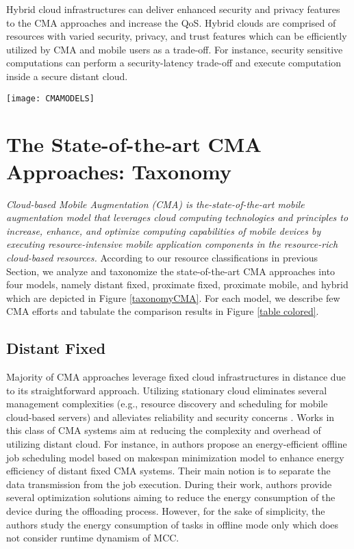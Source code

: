 \documentclass[publish]{IEEEtran}
\begin{document}
Hybrid cloud infrastructures can deliver enhanced security and privacy features to the CMA approaches and increase the QoS. Hybrid clouds are comprised of resources with varied security, privacy, and trust features which can be efficiently utilized by CMA and mobile users as a trade-off. For instance, security sensitive computations can perform a security-latency trade-off and execute computation inside a secure distant cloud.

\begin{figure*}[t]
\centering
\texttt{[image: CMAMODELS]} 
\caption{Taxonomy of State-of-the-art CMA Models.} \label{taxonomyCMA}
\end{figure*}

\section{The State-of-the-art CMA Approaches: Taxonomy}\label{state-of-the-art}
\textit{Cloud-based Mobile Augmentation (CMA) is the-state-of-the-art mobile augmentation model that leverages cloud computing technologies and principles to increase, enhance, and optimize computing capabilities of mobile devices by executing resource-intensive mobile application components in the resource-rich cloud-based resources.} According to our resource classifications in previous Section, we analyze and taxonomize the state-of-the-art CMA approaches into four models, namely distant fixed, proximate fixed, proximate mobile, and hybrid which are depicted in Figure \ref{taxonomyCMA}. For each model, we describe few CMA efforts and tabulate the comparison results in Figure \ref{table colored}. 

\subsection{Distant Fixed}
Majority of CMA approaches \cite{Chuna, Chun2009, Kemp2010, Kemp2010a, Kempa,Guo2011, Zhang2011, cuervo2010maui,Chun2011,Verbelen2012, Broberg2009, DiFrancesco2012} leverage fixed cloud infrastructures in distance due to its straightforward approach. Utilizing stationary cloud eliminates several management complexities (e.g., resource discovery and scheduling for mobile cloud-based servers) and alleviates reliability and security concerns \cite{Kristensen2010}. Works in this class of CMA systems aim at reducing the complexity and overhead of utilizing distant cloud. For instance, in \cite{DiFrancesco2012} authors propose an energy-efficient offline job scheduling  model based on makespan minimization model to enhance energy efficiency of distant fixed CMA systems. Their main notion is to separate the data transmission from the job execution. During their work, authors provide several optimization solutions aiming to reduce the energy consumption of the device during the offloading process. However, for the sake of simplicity, the authors study the energy consumption of tasks in offline mode only which does not consider runtime dynamism of MCC.
\end{document}
